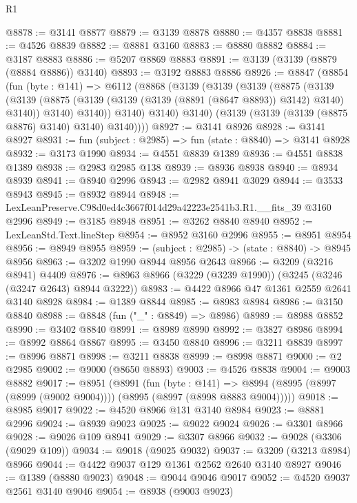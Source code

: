 \begin{lexlean}{R1}
\begin{coremodule}
@8878 := @3141 @8877
@8879 := @3139 @8878
@8880 := @4357 @8838
@8881 := @4526 @8839
@8882 := @8881 @3160
@8883 := @8880 @8882
@8884 := @3187 @8883
@8886 := @5207 @8869 @8883
@8891 := @3139 (@3139 (@8879 (@8884 @8886)) @3140)
@8893 := @3192 @8883 @8886
@8926 := @8847
    (@8854
      (fun (byte : @141) =>
      @6112
        (@8868
          (@3139
            (@3139
              (@3139
                (@8875
                  (@3139
                    (@3139
                      (@8875 (@3139 (@3139 (@3139 (@8891 (@8647 @8893)) @3142) @3140) @3140))
                      @3140)
                    @3140))
                @3140)
              @3140)
            @3140)
          (@3139 (@3139 (@3139 (@8875 @8876) @3140) @3140) @3140))))
@8927 := @3141 @8926
@8928 := @3141 @8927
@8931 := fun (subject : @2985) => fun (state : @8840) => @3141 @8928
@8932 := @3173 @1990
@8934 := @4551 @8839 @1389
@8936 := @4551 @8838 @1389
@8938 := @2983 @2985 @138
@8939 := @8936 @8938
@8940 := @8934 @8939
@8941 := @8940 @2996
@8943 := @2982 @8941 @3029
@8944 := @3533 @8943
@8945 := @8932 @8944
@8948 := LexLeanPreserve.C98d0ed4c3667f014d29a42223e2541b3.R1.__fits_39 @3160 @2996
@8949 := @3185 @8948
@8951 := @3262 @8840 @8940
@8952 := LexLeanStd.Text.lineStep
@8954 := @8952 @3160 @2996
@8955 := @8951 @8954
@8956 := @8949 @8955
@8959 := (subject : @2985) -> (state : @8840) -> @8945 @8956
@8963 := @3202 @1990 @8944 @8956 @2643
@8966 := @3209 (@3216 @8941) @4409
@8976 := @8963 @8966 (@3229 (@3239 @1990)) (@3245 (@3246 (@3247 @2643) @8944 @3222))
@8983 := @4422 @8966 @47 @1361 @2559 @2641 @3140 @8928
@8984 := @1389 @8844
@8985 := @8983 @8984
@8986 := @3150 @8840
@8988 := @8848 (fun ("_" : @8849) => @8986)
@8989 := @8988 @8852
@8990 := @3402 @8840
@8991 := @8989 @8990
@8992 := @3827 @8986
@8994 := @8992 @8864 @8867
@8995 := @3450 @8840
@8996 := @3211 @8839
@8997 := @8996 @8871
@8998 := @3211 @8838
@8999 := @8998 @8871
@9000 := @2 @2985
@9002 := @9000 (@8650 @8893)
@9003 := @4526 @8838
@9004 := @9003 @8882
@9017 := @8951
    (@8991
      (fun (byte : @141) =>
      @8994 (@8995 (@8997 (@8999 (@9002 @9004)))) (@8995 (@8997 (@8998 @8883 @9004)))))
@9018 := @8985 @9017
@9022 := @4520 @8966 @131 @3140 @8984
@9023 := @8881 @2996
@9024 := @8939 @9023
@9025 := @9022 @9024
@9026 := @3301 @8966
@9028 := @9026 @109 @8941
@9029 := @3307 @8966
@9032 := @9028 (@3306 (@9029 @109))
@9034 := @9018 (@9025 @9032)
@9037 := @3209 (@3213 @8984) @8966
@9044 := @4422 @9037 @129 @1361 @2562 @2640 @3140 @8927
@9046 := @1389 (@8880 @9023)
@9048 := @9044 @9046 @9017
@9052 := @4520 @9037 @2561 @3140 @9046
@9054 := @8938 (@9003 @9023)

\end{coremodule}
\end{lexlean}
